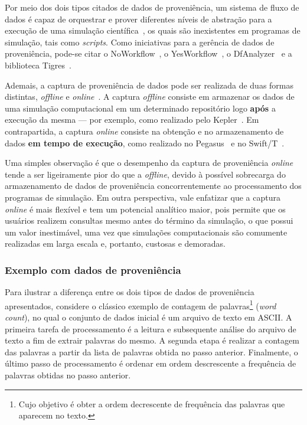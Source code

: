 Por meio dos dois tipos citados de dados de proveniência, um sistema de fluxo de dados é capaz de orquestrar e prover diferentes níveis de abstração para a execução de uma simulação científica~\cite{murta2014noworkflow}, os quais são inexistentes em programas de simulação, tais como \textit{scripts}. Como iniciativas para a gerência de dados de proveniência, pode-se citar o NoWorkflow~\cite{murta2014noworkflow}, o YesWorkflow~\cite{mcphillips2015yesworkflow}, o DfAnalyzer~\cite{silva2016situ} e a biblioteca Tigres~\cite{hendrix2016tigres}.

Ademais, a captura de proveniência de dados pode ser realizada de duas formas distintas, \textit{offline} e \textit{online}~\cite{silva2015propostadoutorado}. A captura \textit{offline} consiste em armazenar os dados de uma simulação computacional em um determinado repositório logo \textbf{após} a execução da mesma --- por exemplo, como realizado pelo Kepler~\cite{ludascher2006scientific}. Em contrapartida, a captura \textit{online} consiste na obtenção e no armazenamento de dados \textbf{em tempo de execução}, como realizado no Pegasus~\cite{deelman2005pegasus} e no Swift/T~\cite{zhao2007swift}.

Uma simples observação é que o desempenho da captura de proveniência \textit{online} tende a ser ligeiramente pior do que a \textit{offline}, devido à possível sobrecarga do armazenamento de dados de proveniência concorrentemente ao processamento dos programas de simulação. Em outra perspectiva, vale enfatizar que a captura \textit{online} é mais flexível e tem um potencial analítico maior, pois permite que os usuários realizem consultas mesmo antes do término da simulação, o que possui um valor inestimável, uma vez que simulações computacionais são comumente realizadas em larga escala e, portanto, custosas e demoradas.

\subsubsection{Exemplo com dados de proveniência}

Para ilustrar a diferença entre os dois tipos de dados de proveniência apresentados, considere o clássico exemplo de contagem de palavras\footnote{Cujo objetivo é obter a ordem decrescente de frequência das palavras que aparecem no texto.} (\textit{word count}), no qual o conjunto de dados inicial é um arquivo de texto em  ASCII. A primeira tarefa de processamento é a leitura e subsequente análise do arquivo de texto a fim de extrair palavras do mesmo. A segunda etapa é realizar a contagem das palavras a partir da lista de palavras obtida no passo anterior. Finalmente, o último passo de processamento é ordenar em ordem descrescente a frequência de palavras obtidas no passo anterior.

